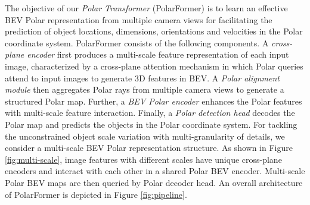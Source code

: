 \documentclass[letterpaper]{article} \usepackage{aaai23}  \usepackage{times}  \usepackage{helvet}  \usepackage{courier}  \usepackage[hyphens]{url}  \usepackage{graphicx} \urlstyle{rm} \def\UrlFont{\rm}  \usepackage{natbib}  \usepackage{caption} \frenchspacing  \setlength{\pdfpagewidth}{8.5in} \setlength{\pdfpageheight}{11in} \usepackage{algorithm}
\begin{document}
The objective of our {\em Polar Transformer} (PolarFormer) is to learn an effective 
BEV Polar representation 
from multiple camera views for facilitating the prediction of object locations, dimensions, orientations and velocities in the Polar coordinate system.
PolarFormer consists of the following components.
A {\em cross-plane encoder} first
produces a multi-scale feature representation of
each input image, characterized by a cross-plane attention mechanism in which Polar queries attend to input images to generate 3D features in BEV. 
A {\em Polar alignment module} then aggregates Polar rays from multiple camera views to generate a structured Polar map. Further, a {\em BEV Polar encoder} enhances the Polar features with multi-scale feature interaction. Finally, a {\em Polar detection head} decodes the Polar map and predicts the objects in the Polar coordinate system. 
For tackling the unconstrained object scale variation with multi-granularity of details,
we consider a multi-scale BEV Polar representation structure. 
As shown in Figure \ref{fig:multi-scale}, image features with different scales have unique cross-plane encoders
and interact with each other in a shared Polar BEV encoder. 
Multi-scale Polar BEV maps are then queried by Polar decoder head.
An overall architecture of PolarFormer is depicted in Figure \ref{fig:pipeline}.
\end{document}
